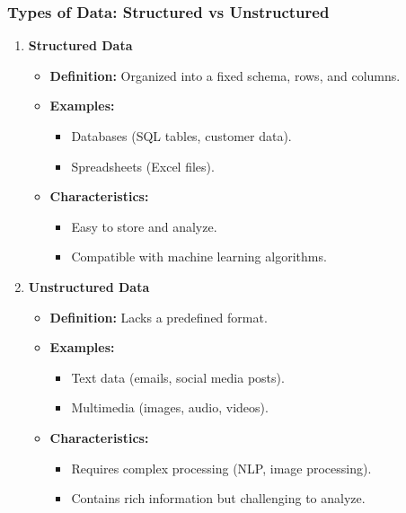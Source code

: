 \documentclass[aspectratio=169]{beamer}
\begin{document}
\begin{frame}[fragile]
    \frametitle{Types of Data: Structured vs Unstructured}
    
    \begin{enumerate}
        \item \textbf{Structured Data}
        \begin{itemize}
            \item \textbf{Definition:} Organized into a fixed schema, rows, and columns.
            \item \textbf{Examples:}
            \begin{itemize}
                \item Databases (SQL tables, customer data).
                \item Spreadsheets (Excel files).
            \end{itemize}
            \item \textbf{Characteristics:}
            \begin{itemize}
                \item Easy to store and analyze.
                \item Compatible with machine learning algorithms.
            \end{itemize}
        \end{itemize}
        
        \item \textbf{Unstructured Data}
        \begin{itemize}
            \item \textbf{Definition:} Lacks a predefined format.
            \item \textbf{Examples:}
            \begin{itemize}
                \item Text data (emails, social media posts).
                \item Multimedia (images, audio, videos).
            \end{itemize}
            \item \textbf{Characteristics:}
            \begin{itemize}
                \item Requires complex processing (NLP, image processing).
                \item Contains rich information but challenging to analyze.
            \end{itemize}
        \end{itemize}
    \end{enumerate}

\end{frame}
\end{document}
